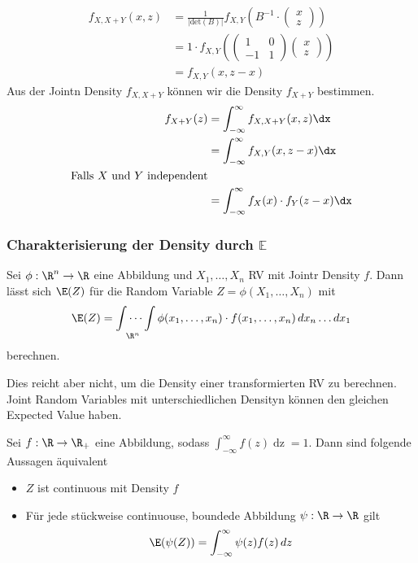 \begin{align*}
    f_{X, X+Y}(x, z) &= \frac{1}{|\text{det}(B)|}f_{X, Y}\left(B^{-1}\cdot 
    \left(\begin{matrix}
        x\\
        z
    \end{matrix}\right)\right)\\
    &= 1 \cdot f_{X, Y}\left(\left(\begin{matrix}
        1 & 0\\
        -1 & 1
    \end{matrix}\right)\left(\begin{matrix}
        x\\
        z
    \end{matrix}\right)\right)\\
    &= f_{X, Y}\left(x, z-x\right)
\end{align*}
Aus der Jointn Density $f_{X, X + Y}$ können wir die Density $f_{X + Y}$ bestimmen.
\begin{align*}
    f_{X+Y}(z) &= \int_{-\infty}^{\infty}f_{X, X + Y}(x, z) \dx\\
    &= \int_{-\infty}^{\infty} f_{X,Y}(x, z-x) \dx\\
    \text{Falls $X$ und $Y$ independent}\\
    &= \int_{-\infty}^{\infty}f_X(x)\cdot f_Y(z-x) \dx
\end{align*}
\subsubsection{Charakterisierung der Density durch \(\mathbb{E}\)}
    Sei $\phi: \R^n \to \R$ eine Abbildung und $X_1, \ldots, X_n$ RV mit Jointr Density $f$. 
    Dann lässt sich $\E(Z)$ für die Random Variable $Z=\phi(X_1, \ldots, X_n)$ mit 
    $$\E(Z) =\idotsint\limits_{\R^n}\phi(x_1, \ldots, x_n)\cdot f(x_1, \ldots, x_n)\mathop{dx_n}\ldots\mathop{dx_1}$$
    berechnen.

Dies reicht aber nicht, um die Density einer transformierten RV zu berechnen. Joint Random Variables mit unterschiedlichen Densityn können den gleichen Expected Value haben.

\begin{subbox}{}
    Sei $f: \R \to \R_+$ eine Abbildung, sodass $\int_{-\infty}^{\infty}f(z)\mathop{dz} = 1$. Dann sind folgende Aussagen äquivalent
    \begin{itemize}
        \item $Z$ ist continuous mit Density $f$
        \item Für jede stückweise continuouse, boundede Abbildung $\psi: \R \to \R$ gilt 
        \[\E(\psi(Z)) = \int_{-\infty}^{\infty}\psi(z)f(z)\mathop{dz}\]
    \end{itemize}
\end{subbox}


